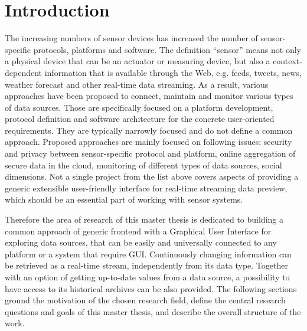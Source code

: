 
\chapter{Introduction}

  \begin{singlespace}
     The increasing numbers of sensor devices has increased the number of sensor-specific protocols, platforms and software. The definition ``sensor'' means not only a physical device that can be an actuator or measuring device, but also a context-dependent information that is available through the Web, e.g. feeds, tweets, news, weather forecast and other real-time data streaming. As a result, various approaches have been proposed to connect, maintain and monitor various types of data sources\cite{6588063,bendel2013service,song2010real}. Those are specifically focused on a platform development, protocol definition and software architecture for the concrete user-oriented requirements. They are typically narrowly focused and do not define a common approach. Proposed approaches are  mainly focused on following issues: security and privacy between sensor-specific protocol and platform, online aggregation of secure data in the cloud, monitoring of different types of data sources, social dimensions\cite{eggert2013sensorcloud}. Not a single project from the list above covers aspects of providing a generic extensible user-friendly interface for real-time streaming data preview, which should be an essential part of working with sensor systems.

     Therefore the area of research of this master thesis is dedicated to building a common approach of generic frontend with a Graphical User Interface for exploring data sources, that can be easily and universally connected to any platform or a system that require GUI. Continuously changing information can be retrieved as a real-time stream, independently from its data type. Together with an option of getting up-to-date values from a data source, a possibility to have access to its historical archives can be also provided. The following sections ground the motivation of the chosen research field, define the central research questions and goals of this master thesis, and describe the overall structure of the work.
  \end{singlespace}

